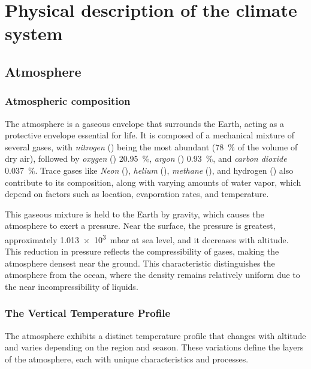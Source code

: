 \chapter{Physical description of the climate system}\label{ch:climate-system-description}

\section{Atmosphere}\label{sec:atm-description}

\subsection{Atmospheric composition}\label{subsec:atm-composition]}

The atmosphere is a gaseous envelope that surrounds the Earth, acting as a protective envelope essential for life.
It is composed of a mechanical mixture of several gases, with \emph{nitrogen} () being the most abundant (\qty{78}{\percent} of the volume of dry air),
followed by \emph{oxygen} () \qty{20.95}{\percent}, \emph{argon} () \qty{0.93}{\percent},
and \emph{carbon dioxide}  \qty{0.037}{\percent}.
Trace gases like \emph{Neon} (), \emph{helium} (), \emph{methane} (), and hydrogen () also contribute to its composition, along
with varying amounts of water vapor, which depend on factors such as location, evaporation rates, and temperature.

This gaseous mixture is held to the Earth by gravity, which causes the atmosphere to exert a pressure. Near the surface, the pressure is greatest, approximately \qty{1.013e3}{\milli\bar} at sea level, and it decreases with altitude. This reduction in pressure reflects the compressibility of gases, making the atmosphere densest near the ground. This characteristic distinguishes the atmosphere from the ocean, where the density remains relatively uniform due to the near incompressibility of liquids.

\subsection{The Vertical Temperature Profile}\label{subsec:vertical-temp-profile}

The atmosphere exhibits a distinct temperature profile that changes with altitude and varies depending on the region and season. These variations define the layers of the atmosphere, each with unique characteristics and processes.

